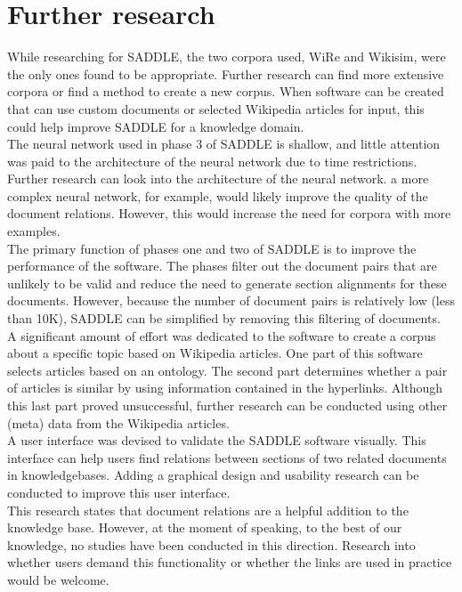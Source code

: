 \section{Further research}

While researching for SADDLE, the two corpora used, WiRe and Wikisim, were the only ones found to be appropriate. Further research can find more extensive corpora or find a method to create a new corpus. When software can be created that can use custom documents or selected Wikipedia articles for input, this could help improve SADDLE for a knowledge domain.\\

The neural network used in phase 3 of SADDLE is shallow, and little attention was paid to the architecture of the neural network due to time restrictions. Further research can look into the architecture of the neural network. a more complex neural network, for example, would likely improve the quality of the document relations. However, this would increase the need for corpora with more examples.\\

The primary function of phases one and two of SADDLE is to improve the performance of the software. The phases filter out the document pairs that are unlikely to be valid and reduce the need to generate section alignments for these documents. However, because the number of document pairs is relatively low (less than 10K), SADDLE can be simplified by removing this filtering of documents.\\

A significant amount of effort was dedicated to the software to create a corpus about a specific topic based on Wikipedia articles. One part of this software selects articles based on an ontology. The second part determines whether a pair of articles is similar by using information contained in the hyperlinks. Although this last part proved unsuccessful, further research can be conducted using other (meta) data from the Wikipedia articles.\\

A user interface was devised to validate the SADDLE software visually. This interface can help users find relations between sections of two related documents in knowledgebases. Adding a graphical design and usability research can be conducted to improve this user interface.\\

This research states that document relations are a helpful addition to the knowledge base. However, at the moment of speaking, to the best of our knowledge, no studies have been conducted in this direction. Research into whether users demand this functionality or whether the links are used in practice would be welcome.
